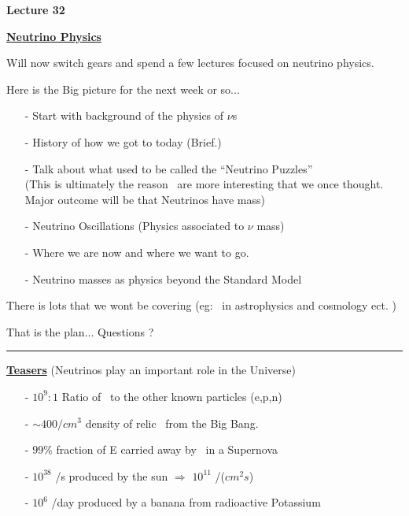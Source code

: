 \usepackage{fancyhdr}

\fancyhf{}


\thispagestyle{fancy}

\begin{center}
{\huge \textbf{Lecture 32}}
\end{center}

{\fontsize{14}{16}\selectfont

\textbf{\underline{Neutrino Physics}} 

Will now switch gears and spend a few lectures focused on neutrino physics. 

Here is the Big picture for the next week or so...

\begin{itemize}
\item[-] Start with background of the physics of $\nu$s
\item[-] History of how we got to today (Brief.)
\item[-] Talk about what used to be called the ``Neutrino Puzzles''\\
          (This is ultimately the reason \nus\ are more interesting that we once thought. Major outcome will be that Neutrinos have mass)
\item[-] Neutrino Oscillations (Physics associated to $\nu$ mass)
\item[-] Where we are now and where we want to go.
\item[-] Neutrino masses as physics beyond the Standard Model\\
\end{itemize}

There is lots that we wont be covering (eg: \nus\ in astrophysics and cosmology ect. )

\vspace*{0.4in}

That is the plan... Questions ?

\vspace*{0.2in}

\noindent\rule{\textwidth}{1pt}

\textbf{\underline{Teasers}} (Neutrinos play an important role in the Universe)

\begin{itemize}
\item[-] $10^9:1$ Ratio of \nus\ to the other known particles (e,p,n)
\item[-] $\sim400/cm^3$ density of relic \nus\ from the Big Bang.
\item[-] $99\%$ fraction of E carried away by \nus\ in a Supernova
\item[-] $10^{38}$ \nus/s produced by the sun $\Rightarrow$ $10^{11}$ \nus/($cm^2s$)
\item[-] $10^6$ \nus/day produced by a banana from radioactive Potassium
\end{itemize}

}
